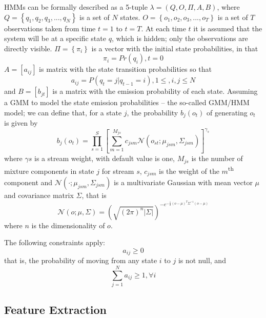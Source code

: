 \ac{HMM}s can be formally described as a 5-tuple $\lambda = \left (Q, O, \Pi, A, B\right )$, where $Q = \left \{q_1, q_2, q_3, ..., q_N\right \}$  is a set of $N$ states. $O = \left \{o_1, o_2, o_3, ..., o_T\right \}$ is a set of $T$ observations taken from time $t = 1$ to $t = T$. At each time $t$ it is assumed that the system will be at a specific state $q$, which is hidden; only the observations are directly visible. $\Pi = \left \{\pi_i \right \}$ is a vector with the initial state probabilities, in that
\begin{equation}
\pi_i = Pr(q_i), t = 0
\end{equation}
$A = [a_{ij}]$ is matrix with the state transition probabilities so that
\begin{equation}
a_{ij} = P(q_t = j | q_{t-1} = i),  1 \leq, i, j \leq N
\end{equation}
and $B = [b_{jt}]$ is a matrix with the emission probability of each state. Assuming a \ac{GMM} to model the state emission probabilities -- the so-called GMM/HMM model; we can define that, for a state $j$, the probability $b_j(o_t)$ of generating $o_t$ is given by
\begin{equation}
 b_j(o_t) = \prod_{s=1}^{S}\left [ \sum_{m=1}^{M_{js}} c_{jsm}\mathcal{N}(o_{st}; \mu_{jsm}, \Sigma_{jsm}) \right ]^{\gamma_s}
\end{equation}
where $\gamma s$ is a stream weight, with default value is one, $M_{js}$ is the number of mixture components in state $j$ for stream $s$, $c_{jsm}$ is the weight of the $m$\textsuperscript{th} component and $\mathcal{N}(\cdot; \mu_{jsm}, \Sigma_{jsm})$ is a multivariate Gaussian with mean vector $\mu$ and covariance matrix $\Sigma$, that is
\begin{equation}
 \mathcal{N}(o; \mu, \Sigma) = (\sqrt{(2\pi)^{n}\left |\Sigma\right |})^{-e^{-\frac{1}{2}(o-\mu)^{T}\Sigma^{-1}(o-\mu)}}
\end{equation}
where $n$ is the dimensionality of $o$.

The following constraints apply:
\begin{equation}
a_{ij} \geq 0
\end{equation}
that is, the probability of moving from any state $i$ to $j$ is not null, and
\begin{equation}
\sum_{j=1}^{N} a_{ij} \geq 1, \forall i
\end{equation}

\subsection{Feature Extraction}

